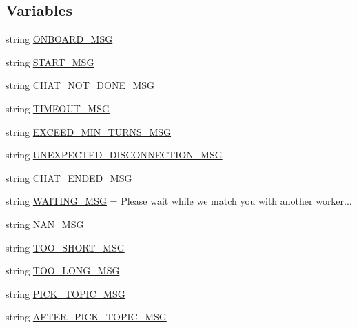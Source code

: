 \subsection*{Variables}
\begin{DoxyCompactItemize}
\item 
string \hyperlink{namespacemturk_1_1worlds_a6eed507f42a105d40cffade5287a7a0a}{O\+N\+B\+O\+A\+R\+D\+\_\+\+M\+SG}
\item 
string \hyperlink{namespacemturk_1_1worlds_a94bf5082f959a76c294945bb387305d3}{S\+T\+A\+R\+T\+\_\+\+M\+SG}
\item 
string \hyperlink{namespacemturk_1_1worlds_a93dac8fe3734ce10f8e25dad93e2f164}{C\+H\+A\+T\+\_\+\+N\+O\+T\+\_\+\+D\+O\+N\+E\+\_\+\+M\+SG}
\item 
string \hyperlink{namespacemturk_1_1worlds_a5c73054a085bb461debad57233769934}{T\+I\+M\+E\+O\+U\+T\+\_\+\+M\+SG}
\item 
string \hyperlink{namespacemturk_1_1worlds_a6baba41854cb64fcf5961b227e3e9c09}{E\+X\+C\+E\+E\+D\+\_\+\+M\+I\+N\+\_\+\+T\+U\+R\+N\+S\+\_\+\+M\+SG}
\item 
string \hyperlink{namespacemturk_1_1worlds_ac7d271d5b482f6a2f3f9c34c2f88c1b0}{U\+N\+E\+X\+P\+E\+C\+T\+E\+D\+\_\+\+D\+I\+S\+C\+O\+N\+N\+E\+C\+T\+I\+O\+N\+\_\+\+M\+SG}
\item 
string \hyperlink{namespacemturk_1_1worlds_a77c9582a4139c390382fea704a4d783a}{C\+H\+A\+T\+\_\+\+E\+N\+D\+E\+D\+\_\+\+M\+SG}
\item 
string \hyperlink{namespacemturk_1_1worlds_a91728bfc8e1c3ae3f6934ecb293320d3}{W\+A\+I\+T\+I\+N\+G\+\_\+\+M\+SG} = \textquotesingle{}Please wait while we match you with another worker...\textquotesingle{}
\item 
string \hyperlink{namespacemturk_1_1worlds_a518280763b71ba5d455e81994bb72295}{N\+A\+N\+\_\+\+M\+SG}
\item 
string \hyperlink{namespacemturk_1_1worlds_a9225df5e62c99ba7e20902cb4856fd64}{T\+O\+O\+\_\+\+S\+H\+O\+R\+T\+\_\+\+M\+SG}
\item 
string \hyperlink{namespacemturk_1_1worlds_a28e66a25beb7915896e5f4a3cf9c13af}{T\+O\+O\+\_\+\+L\+O\+N\+G\+\_\+\+M\+SG}
\item 
string \hyperlink{namespacemturk_1_1worlds_ad072e1ee295d56a091eba0eac5213c94}{P\+I\+C\+K\+\_\+\+T\+O\+P\+I\+C\+\_\+\+M\+SG}
\item 
string \hyperlink{namespacemturk_1_1worlds_a70cdda2581e97d7cfe62cb795f9ebf6f}{A\+F\+T\+E\+R\+\_\+\+P\+I\+C\+K\+\_\+\+T\+O\+P\+I\+C\+\_\+\+M\+SG}
\item 

\end{DoxyCompactItemize}
